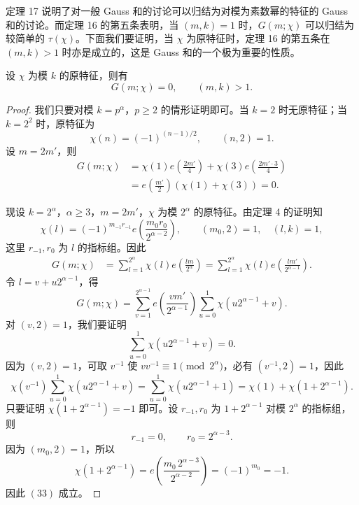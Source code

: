 定理 17 说明了对一般 Gauss 和的讨论可以归结为对模为素数幂的特征的 Gauss 和的讨论。而定理 16 的第五条表明，当 $(m,k)=1$ 时，$G(m;\chi)$ 可以归结为较简单的 $\tau(\chi)$。下面我们要证明，当 $\chi$ 为原特征时，定理 16 的第五条在 $(m,k)>1$ 时亦是成立的，这是 Gauss 和的一个极为重要的性质。

\begin{theorem}[原文 定理 19]
	设 $\chi$ 为模 $k$ 的原特征，则有
	\[
		G(m;\chi)=0,\qquad (m,k)>1.
	\]
\end{theorem}

\begin{proof}
	我们只要对模 $k=p^\alpha$，$p\geq2$ 的情形证明即可。当 $k=2$ 时无原特征；当 $k=2^2$ 时，原特征为
	\[
		\chi(n)=(-1)^{(n-1)/2},\qquad (n,2)=1.
	\]
	设 $m=2m'$，则
	\[
	\begin{aligned}
		G(m;\chi)
		&=
		\chi(1)e\left(\frac{2m'}{4}\right)
		+\chi(3)e\left(\frac{2m'\cdot3}{4}\right)  \\
		&=
		e\left(\frac{m'}{2}\right)(\chi(1)+\chi(3))=0.
	\end{aligned}
	\]

	现设 $k=2^\alpha$，$\alpha\geq3$，$m=2m'$，$\chi$ 为模 $2^\alpha$ 的原特征。由定理 4 的证明知
	\[
		\chi(l)=(-1)^{m_{-1}r_{-1}}
		e\left(\frac{m_0r_0}{2^{\alpha-2}}\right),
		\qquad (m_0,2)=1,\quad (l,k)=1,
	\]
	这里 $r_{-1},r_0$ 为 $l$ 的指标组。因此
	\[
	\begin{aligned}
		G(m;\chi)
		&=
		\sum_{l=1}^{2^\alpha}\chi(l)e\left(\frac{lm}{2^\alpha}\right)
		=
		\sum_{l=1}^{2^\alpha}\chi(l)e\left(\frac{lm'}{2^{\alpha-1}}\right).
	\end{aligned}
	\]
	令 $l=v+u2^{\alpha-1}$，得
	\begin{equation}
		G(m;\chi)=
		\sum_{v=1}^{2^{\alpha-1}}
		e\left(\frac{vm'}{2^{\alpha-1}}\right)
		\sum_{u=0}^{1}\chi(u2^{\alpha-1}+v).
		\tag{32}
	\end{equation}
	对 $(v,2)=1$，我们要证明
	\begin{equation}
		\sum_{u=0}^{1}\chi(u2^{\alpha-1}+v)=0.
		\tag{33}
	\end{equation}
	因为 $(v,2)=1$，可取 $v^{-1}$ 使 $vv^{-1}\equiv1\pmod {2^\alpha}$，必有 $(v^{-1},2)=1$，因此
	\begin{equation}
		\chi(v^{-1})
		\sum_{u=0}^{1}\chi(u2^{\alpha-1}+v)
		=
		\sum_{u=0}^{1}\chi(u2^{\alpha-1}+1)
		=
		\chi(1)+\chi(1+2^{\alpha-1}).
		\tag{34}
	\end{equation}
	只要证明 $\chi(1+2^{\alpha-1})=-1$ 即可。设 $r_{-1},r_0$ 为 $1+2^{\alpha-1}$ 对模 $2^\alpha$ 的指标组，则
	\[
		r_{-1}=0,\qquad r_0=2^{\alpha-3}.
	\]
	因为 $(m_0,2)=1$，所以
	\[
		\chi(1+2^{\alpha-1})
		=
		e\left(\frac{m_0\,2^{\alpha-3}}{2^{\alpha-2}}\right)
		=
		(-1)^{m_0}
		=-1.
	\]
	因此 \((33)\) 成立。


\end{proof}
